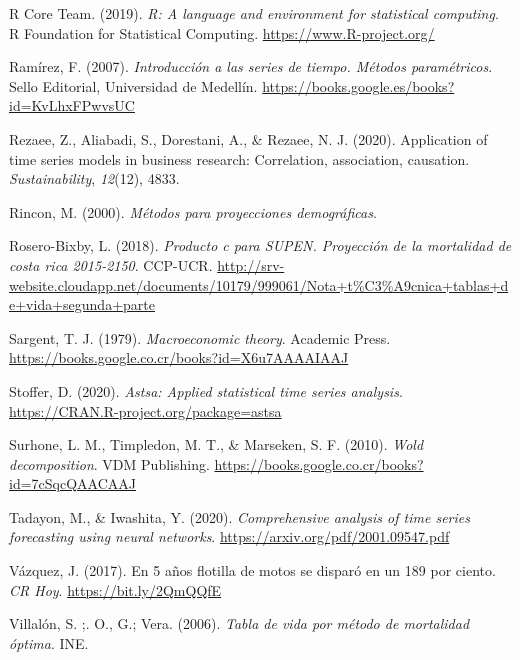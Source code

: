 \documentclass[
]{article}
\newlength{\cslhangindent}
\newlength{\cslentryspacingunit} %
\newenvironment{CSLReferences}[2] %
 {%
  \setlength{\parindent}{0pt}
  \ifodd #1
  \let\oldpar\par
  \def\par{\hangindent=\cslhangindent\oldpar}
  \fi
  \setlength{\parskip}{#2\cslentryspacingunit}
 }%
 {}
\begin{document}
\begin{CSLReferences}{1}{0}
\leavevmode{}%
R Core Team. (2019). \emph{R: A language and environment for statistical
computing}. R Foundation for Statistical Computing.
\url{https://www.R-project.org/}

\leavevmode{}%
Ramírez, F. (2007). \emph{Introducción a las series de tiempo. Métodos
paramétricos}. Sello Editorial, Universidad de Medellín.
\url{https://books.google.es/books?id=KvLhxFPwvsUC}

\leavevmode{}%
Rezaee, Z., Aliabadi, S., Dorestani, A., \& Rezaee, N. J. (2020).
Application of time series models in business research: Correlation,
association, causation. \emph{Sustainability}, \emph{12}(12), 4833.

\leavevmode{}%
Rincon, M. (2000). \emph{Métodos para proyecciones demográficas}.

\leavevmode{}%
Rosero-Bixby, L. (2018). \emph{Producto c para SUPEN. Proyección de la
mortalidad de costa rica 2015-2150}. CCP-UCR.
\url{http://srv-website.cloudapp.net/documents/10179/999061/Nota+t\%C3\%A9cnica+tablas+de+vida+segunda+parte}

\leavevmode{}%
Sargent, T. J. (1979). \emph{Macroeconomic theory}. Academic Press.
\url{https://books.google.co.cr/books?id=X6u7AAAAIAAJ}

\leavevmode{}%
Stoffer, D. (2020). \emph{Astsa: Applied statistical time series
analysis}. \url{https://CRAN.R-project.org/package=astsa}

\leavevmode{}%
Surhone, L. M., Timpledon, M. T., \& Marseken, S. F. (2010). \emph{Wold
decomposition}. VDM Publishing.
\url{https://books.google.co.cr/books?id=7cSqcQAACAAJ}

\leavevmode{}%
Tadayon, M., \& Iwashita, Y. (2020). \emph{Comprehensive analysis of
time series forecasting using neural networks}.
\url{https://arxiv.org/pdf/2001.09547.pdf}

\leavevmode{}%
Vázquez, J. (2017). En 5 años flotilla de motos se disparó en un 189 por
ciento. \emph{CR Hoy}. \url{https://bit.ly/2QmQQfE}

\leavevmode{}%
Villalón, S. ;. O., G.; Vera. (2006). \emph{Tabla de vida por método de
mortalidad óptima}. INE.


\end{CSLReferences}
\end{document}
